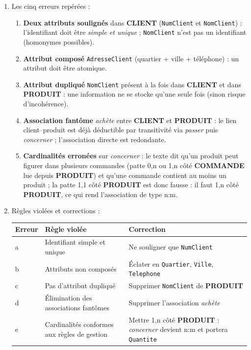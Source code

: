 \documentclass[11pt]{article}
\begin{document}
\begin{corrige}
\begin{enumerate}
  \item Les cinq erreurs repérées :
  \begin{enumerate}
    \item \textbf{Deux attributs soulignés} dans \textbf{CLIENT} (\texttt{NumClient} et \texttt{NomClient}) : l'identifiant doit être \emph{simple et unique} ; \texttt{NomClient} n'est pas un identifiant (homonymes possibles).
    \item \textbf{Attribut composé} \texttt{AdresseClient} (quartier + ville + téléphone) : un attribut doit être atomique.
    \item \textbf{Attribut dupliqué} \texttt{NomClient} présent à la fois dans \textbf{CLIENT} et dans \textbf{PRODUIT} : une information ne se stocke qu'une seule fois (sinon risque d'incohérence).
    \item \textbf{Association fantôme} \emph{achète} entre \textbf{CLIENT} et \textbf{PRODUIT} : le lien client--produit est déjà déductible par transitivité via \emph{passer} puis \emph{concerner} ; l'association directe est redondante.
    \item \textbf{Cardinalités erronées} sur \emph{concerner} : le texte dit qu'un produit peut figurer dans plusieurs commandes (patte 0,n ou 1,n côté \textbf{COMMANDE} lue depuis \textbf{PRODUIT}) et qu'une commande contient au moins un produit ; la patte 1,1 côté \textbf{PRODUIT} est donc fausse : il faut 1,n côté \textbf{PRODUIT}, ce qui rend l'association de type n:m.
  \end{enumerate}
  \item Règles violées et corrections :
  \begin{center}
  \begin{tabularx}{\linewidth}{|l|X|X|}\hline
  \rowcolor{popblueL} \textbf{Erreur} & \textbf{Règle violée} & \textbf{Correction} \\ \hline
  a & Identifiant simple et unique & Ne souligner que \texttt{NumClient} \\ \hline
  b & Attributs non composés & Éclater en \texttt{Quartier}, \texttt{Ville}, \texttt{Telephone} \\ \hline
  c & Pas d'attribut dupliqué & Supprimer \texttt{NomClient} de \textbf{PRODUIT} \\ \hline
  d & Élimination des associations fantômes & Supprimer l'association \emph{achète} \\ \hline
  e & Cardinalités conformes aux règles de gestion & Mettre 1,n côté \textbf{PRODUIT} : \emph{concerner} devient n:m et portera \texttt{Quantite} \\ \hline

\end{tabularx}
\end{center}
\end{enumerate}
\end{corrige}
\end{document}
